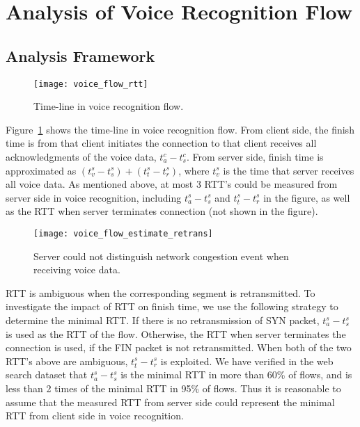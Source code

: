 
\section{Analysis of Voice Recognition Flow}

\subsection{Analysis Framework}

\begin{figure}[th]
\centering
	\texttt{[image: voice\_flow\_rtt]}
\caption{Time-line in voice recognition flow.}
\label{fig:voice_flow_rtt}
\end{figure}

Figure~\ref{fig:voice_flow_rtt} shows the time-line in voice recognition flow. From client side, the finish time is from that client initiates the connection to that client receives all acknowledgments of the voice data, \ie $t^c_a - t^c_s$. From server side, finish time is approximated as $(t^s_v - t^s_s) + (t^s_t - t^s_r)$, where $t^s_v$ is the time that server receives all voice data. As mentioned above, at most 3 RTT's could be measured from server side in voice recognition, including $t^s_a - t^s_s$ and $t^s_t - t^s_r$ in the figure, as well as the RTT when server terminates connection (not shown in the figure).

\begin{figure*}[th]
\centering
	\texttt{[image: voice\_flow\_estimate\_retrans]}
\caption{Server could not distinguish network congestion event when receiving voice data.}
\label{fig:voice_flow_estimate_retrans}
\end{figure*}

RTT is ambiguous when the corresponding segment is retransmitted. To investigate the impact of RTT on finish time, we use the following strategy to determine the minimal RTT. If there is no retransmission of SYN packet, $t^s_a - t^s_s$ is used as the RTT of the flow. Otherwise, the RTT when server terminates the connection is used, if the FIN packet is not retransmitted. When both of the two RTT's above are ambiguous, $t^s_t - t^s_r$ is exploited. We have verified in the web search dataset that $t^s_a - t^s_s$ is the minimal RTT in more than 60\% of flows, and is less than 2 times of the minimal RTT in 95\% of flows. Thus it is reasonable to assume that the measured RTT from server side could represent the minimal RTT from client side in voice recognition.

